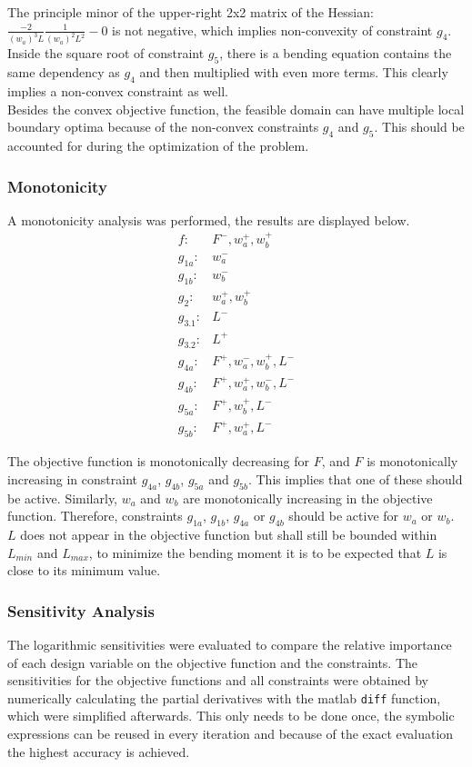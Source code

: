 The principle minor of the upper-right 2x2 matrix of the Hessian: $\frac{-2}{\left( w_a \right)^3 L } \frac{1}{\left( w_a \right)^2 L^2 } - 0 $ is not negative, which implies non-convexity of constraint $g_4$.\\

Inside the square root of constraint $g_5$, there is a bending equation contains the same dependency as $g_4$ and then multiplied with even more terms. This clearly implies a non-convex constraint as well. \\
Besides the convex objective function, the feasible domain can have multiple local boundary optima because of the non-convex constraints $g_4$ and $g_5$. This should be accounted for during the optimization of the problem.

\subsubsection{Monotonicity}
A monotonicity analysis was performed, the results are displayed below. 
\begin{align*}
	f: & F^-, w_a^+, w_b^+ \\
	g_{1a}:& w_a^- \\
	g_{1b}:& w_b^- \\
	g_{2}:& w_a^+, w_b^+\\
	g_{3.1}:& L^- \\
	g_{3.2}:& L^+ \\
	g_{4a}:& F^+, w_a^-, w_b^+, L^- \\
	g_{4b}:& F^+, w_a^+, w_b^-, L^-\\
	g_{5a}:& F^+, w_b^+, L^-\\
	g_{5b}:& F^+, w_a^+, L^-
\end{align*}

The objective function is monotonically decreasing for $F$, and $F$ is monotonically increasing in constraint $g_{4a}$, $g_{4b}$, $g_{5a}$ and $g_{5b}$. This implies that one of these should be active. Similarly, $w_a$ and $w_b$ are monotonically increasing in the objective function. Therefore, constraints $g_{1a}$, $g_{1b}$, $g_{4a}$ or $g_{4b}$ should be active for $w_a$ or $w_b$. $L$ does not appear in the objective function but shall still be bounded within $L_{min}$ and $L_{max}$, to minimize the bending moment it is to be expected that $L$ is close to its minimum value. 




\subsubsection{Sensitivity Analysis}
The logarithmic sensitivities were evaluated to compare the relative importance of each design variable on the objective function and the constraints. The sensitivities for the objective functions and all constraints were obtained by numerically calculating the partial derivatives with the matlab \texttt{diff} function, which were simplified afterwards. This only needs to be done once, the symbolic expressions can be reused in every iteration and because of the exact evaluation the highest accuracy is achieved. \\

